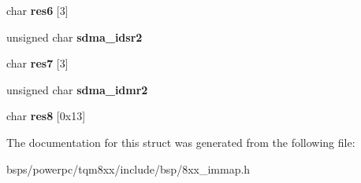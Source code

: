 \begin{DoxyCompactItemize}
char {\bfseries res6} \mbox{[}3\mbox{]}
\item 
\mbox{\label{structsdma__csr_a45c39e80c85f184a55a8b35fe141d34a}} 
unsigned char {\bfseries sdma\+\_\+idsr2}
\item 
\mbox{\label{structsdma__csr_a34906b1447bb5d6d0e601b09441fd996}} 
char {\bfseries res7} \mbox{[}3\mbox{]}
\item 
\mbox{\label{structsdma__csr_a064c45afa72db8aaaa659c46659d0906}} 
unsigned char {\bfseries sdma\+\_\+idmr2}
\item 
\mbox{\label{structsdma__csr_a6b36590dc74226d6c298838aa9af72a0}} 
char {\bfseries res8} \mbox{[}0x13\mbox{]}
\end{DoxyCompactItemize}


The documentation for this struct was generated from the following file\+:\begin{DoxyCompactItemize}
\item 
bsps/powerpc/tqm8xx/include/bsp/8xx\+\_\+immap.\+h\end{DoxyCompactItemize}
